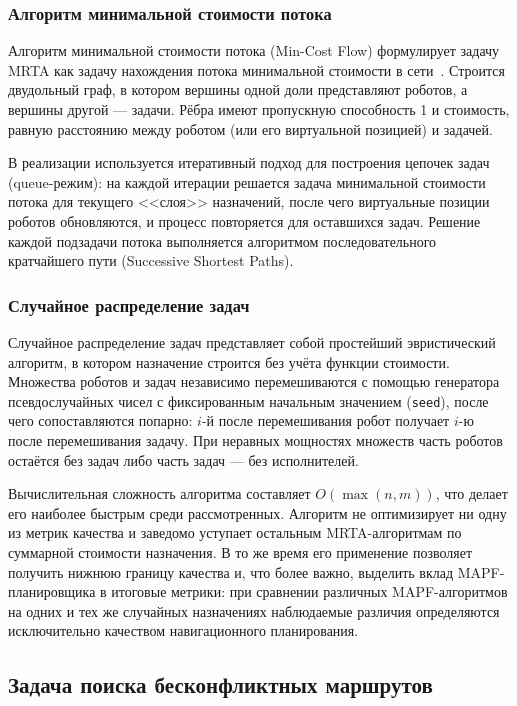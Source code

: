 \subsubsection{Алгоритм минимальной стоимости потока}

Алгоритм минимальной стоимости потока (Min-Cost Flow) формулирует задачу MRTA как задачу нахождения потока минимальной стоимости в сети~\cite{ahuja1993network}. Строится двудольный граф, в котором вершины одной доли представляют роботов, а вершины другой --- задачи. Рёбра имеют пропускную способность 1 и стоимость, равную расстоянию между роботом (или его виртуальной позицией) и задачей.

В реализации используется итеративный подход для построения цепочек задач (queue-режим): на каждой итерации решается задача минимальной стоимости потока для текущего <<слоя>> назначений, после чего виртуальные позиции роботов обновляются, и процесс повторяется для оставшихся задач. Решение каждой подзадачи потока выполняется алгоритмом последовательного кратчайшего пути (Successive Shortest Paths).

\subsubsection{Случайное распределение задач}

Случайное распределение задач представляет собой простейший эвристический алгоритм, в котором назначение строится без учёта функции стоимости. Множества роботов и задач независимо перемешиваются с помощью генератора псевдослучайных чисел с фиксированным начальным значением (\texttt{seed}), после чего сопоставляются попарно: $i$-й после перемешивания робот получает $i$-ю после перемешивания задачу. При неравных мощностях множеств часть роботов остаётся без задач либо часть задач --- без исполнителей.

Вычислительная сложность алгоритма составляет $O(\max(n, m))$, что делает его наиболее быстрым среди рассмотренных. Алгоритм не оптимизирует ни одну из метрик качества и заведомо уступает остальным MRTA-алгоритмам по суммарной стоимости назначения. В то же время его применение позволяет получить нижнюю границу качества и, что более важно, выделить вклад MAPF-планировщика в итоговые метрики: при сравнении различных MAPF-алгоритмов на одних и тех же случайных назначениях наблюдаемые различия определяются исключительно качеством навигационного планирования.

\subsection{Задача поиска бесконфликтных маршрутов}

